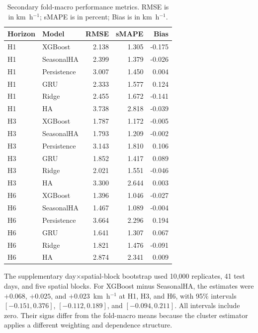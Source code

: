 \documentclass[pdflatex,sn-basic,Numbered]{sn-jnl}
\begin{document}
\begin{table}[!htbp]
\centering
\caption{Secondary fold-macro performance metrics. RMSE is in km~h$^{-1}$; sMAPE is in percent; Bias is in km~h$^{-1}$.}
\label{tab:secondary_metrics}
\footnotesize
\begin{tabular}{|l|l|r|r|r|}
\hline
\textbf{Horizon} & \textbf{Model} & \textbf{RMSE} & \textbf{sMAPE} & \textbf{Bias} \\
\hline
H1 & XGBoost     & 2.138 & 1.305 & -0.175 \\ 
\hline
H1 & SeasonalHA  & 2.399 & 1.379 & -0.026 \\ 
\hline
H1 & Persistence & 3.007 & 1.450 &  0.004 \\ 
\hline
H1 & GRU         & 2.333 & 1.577 &  0.124 \\ 
\hline
H1 & Ridge       & 2.455 & 1.672 & -0.141 \\ 
\hline
H1 & HA          & 3.738 & 2.818 & -0.039 \\
\hline
H3 & XGBoost     & 1.787 & 1.172 & -0.005 \\ 
\hline
H3 & SeasonalHA  & 1.793 & 1.209 & -0.002 \\ 
\hline
H3 & Persistence & 3.143 & 1.810 &  0.106 \\ 
\hline
H3 & GRU         & 1.852 & 1.417 &  0.089 \\ 
\hline
H3 & Ridge       & 2.021 & 1.551 & -0.046 \\ 
\hline
H3 & HA          & 3.300 & 2.644 &  0.003 \\
\hline
H6 & XGBoost     & 1.396 & 1.046 & -0.027 \\ 
\hline
H6 & SeasonalHA  & 1.467 & 1.089 & -0.004 \\ 
\hline
H6 & Persistence & 3.664 & 2.296 &  0.194 \\ 
\hline
H6 & GRU         & 1.641 & 1.307 &  0.067 \\ 
\hline
H6 & Ridge       & 1.821 & 1.476 & -0.091 \\ 
\hline
H6 & HA          & 2.874 & 2.341 &  0.009 \\
\hline
\end{tabular}
\end{table}


The supplementary day$\times$spatial-block bootstrap used 10,000 replicates, 41 test days, and five spatial blocks. For XGBoost minus SeasonalHA, the estimates were $+0.068$, $+0.025$, and $+0.023$~km~h$^{-1}$ at H1, H3, and H6, with 95\% intervals $[-0.151,0.376]$, $[-0.112,0.189]$, and $[-0.094,0.211]$. All intervals include zero. Their signs differ from the fold-macro means because the cluster estimator applies a different weighting and dependence structure.
\end{document}
